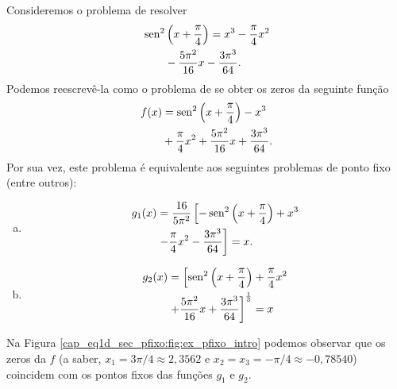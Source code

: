 \begin{ex}\label{cap_eq1d_sec_pfixo:ex:pfixo_intro}
  Consideremos o problema de resolver
  \begin{equation}
    \begin{aligned}
      &\operatorname{sen}^2\left(x+\frac{\pi}{4}\right) = x^3 - \frac{\pi}{4}x^2 \\
      &\qquad - \frac{5\pi^2}{16}x - \frac{3\pi^3}{64}.
    \end{aligned}
\end{equation}
Podemos reescrevê-la como o problema de se obter os zeros da seguinte função
\begin{equation}
  \begin{aligned}
    f(x) &= \operatorname{sen}^2\left(x+\frac{\pi}{4}\right) - x^3 \\
         &+ \frac{\pi}{4}x^2 + \frac{5\pi^2}{16}x + \frac{3\pi^3}{64}.
  \end{aligned}
\end{equation}
Por sua vez, este problema é equivalente aos seguintes problemas de ponto fixo (entre outros):
\begin{enumerate}[a)]
\item
  \begin{equation}
    \begin{aligned}
      g_1(x) &= \frac{16}{5\pi^2}\left[-\operatorname{sen}^2\left(x+\frac{\pi}{4}\right) + x^3 \right. \\
             &\left. - \frac{\pi}{4}x^2 - \frac{3\pi^3}{64}\right] = x.
    \end{aligned}
  \end{equation}
\item
  \begin{equation}
    \begin{aligned}
      g_2(x) &= \left[\operatorname{sen}^2\left(x+\frac{\pi}{4}\right) + \frac{\pi}{4}x^2\right. \\
             &\left. + \frac{5\pi^2}{16}x + \frac{3\pi^3}{64}\right]^{\frac{1}{3}} = x
    \end{aligned}
\end{equation}
\end{enumerate}
Na Figura \ref{cap_eq1d_sec_pfixo:fig:ex_pfixo_intro} podemos observar que os zeros da $f$ (a saber, $x_1=3\pi/4\approx 2,3562$ e $x_2=x_3=-\pi/4\approx -0,78540$) coincidem com os pontos fixos das funções $g_1$ e $g_2$.


\end{ex}
